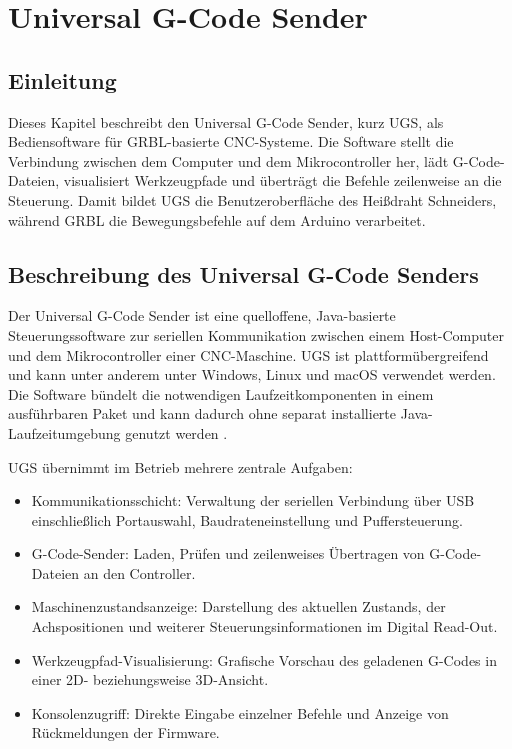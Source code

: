 %
%

\chapter{Universal G-Code Sender}
\label{cha:ugs}

\section{Einleitung}

Dieses Kapitel beschreibt den Universal G-Code Sender, kurz UGS, als Bediensoftware für GRBL-basierte CNC-Systeme. Die Software stellt die Verbindung zwischen dem Computer und dem Mikrocontroller her, lädt G-Code-Dateien, visualisiert Werkzeugpfade und überträgt die Befehle zeilenweise an die Steuerung. Damit bildet UGS die Benutzeroberfläche des Heißdraht Schneiders, während GRBL die Bewegungsbefehle auf dem Arduino verarbeitet.

\section{Beschreibung des Universal G-Code Senders}

Der Universal G-Code Sender ist eine quelloffene, Java-basierte Steuerungssoftware zur seriellen Kommunikation zwischen einem Host-Computer und dem Mikrocontroller einer CNC-Maschine. UGS ist plattformübergreifend und kann unter anderem unter Windows, Linux und macOS verwendet werden. Die Software bündelt die notwendigen Laufzeitkomponenten in einem ausführbaren Paket und kann dadurch ohne separat installierte Java-Laufzeitumgebung genutzt werden \cite{ugs:github}.

UGS übernimmt im Betrieb mehrere zentrale Aufgaben:

\begin{itemize}
	\item Kommunikationsschicht: Verwaltung der seriellen Verbindung über USB einschließlich Portauswahl, Baudrateneinstellung und Puffersteuerung.
	\item G-Code-Sender: Laden, Prüfen und zeilenweises Übertragen von G-Code-Dateien an den Controller.
	\item Maschinenzustandsanzeige: Darstellung des aktuellen Zustands, der Achspositionen und weiterer Steuerungsinformationen im Digital Read-Out.
	\item Werkzeugpfad-Visualisierung: Grafische Vorschau des geladenen G-Codes in einer 2D- beziehungsweise 3D-Ansicht.
	\item Konsolenzugriff: Direkte Eingabe einzelner Befehle und Anzeige von Rückmeldungen der Firmware.
\end{itemize}

